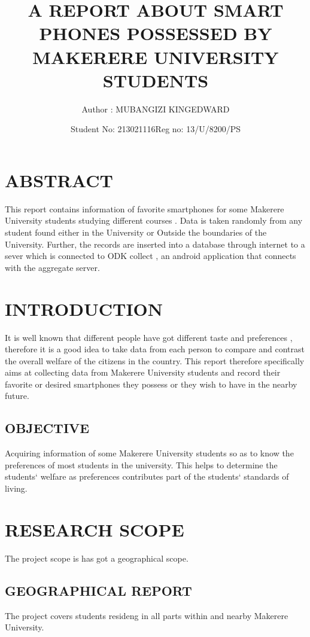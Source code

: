 \documentclass{article}
\begin{document}
		\title{A REPORT ABOUT SMART PHONES POSSESSED BY  MAKERERE UNIVERSITY STUDENTS}
		\author{Author :   MUBANGIZI KINGEDWARD }
		\date{Student No: 213021116}
                      \date{Reg no: 13/U/8200/PS}
		\maketitle
	

	\tableofcontents

\section{ABSTRACT}
This report contains information of favorite smartphones for some Makerere University students studying different courses . Data is taken randomly from any student found either in the University or Outside the boundaries of the University. Further, the records are inserted into a database through internet to a sever which is connected to ODK collect , an android application that connects with the aggregate server.


\section{INTRODUCTION}

It is well known that different people have got different taste and preferences , therefore it is a good idea to take data from each person to compare and contrast the overall welfare of the citizens in the country. This report therefore specifically aims at collecting data from Makerere University students and record their favorite or desired smartphones they possess or they wish to have in the nearby future.

\subsection{OBJECTIVE}

Acquiring information of some Makerere University students so as to know the preferences of most students in the university. This helps to determine the students` welfare as preferences contributes part of the students` standards of living.

\section{RESEARCH SCOPE}
The project scope is has got a geographical scope.
\subsection{GEOGRAPHICAL REPORT}
The project covers students resideng in all parts within and nearby Makerere University.
\end{document}

